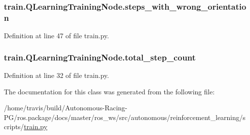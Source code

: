 \subsubsection[{\texorpdfstring{steps\+\_\+with\+\_\+wrong\+\_\+orientation}{steps_with_wrong_orientation}}]{\setlength{\rightskip}{0pt plus 5cm}train.\+Q\+Learning\+Training\+Node.\+steps\+\_\+with\+\_\+wrong\+\_\+orientation}\hypertarget{classtrain_1_1_q_learning_training_node_a87a28e543665823ac18758f6a4460d7a}{}\label{classtrain_1_1_q_learning_training_node_a87a28e543665823ac18758f6a4460d7a}


Definition at line 47 of file train.\+py.

\subsubsection[{\texorpdfstring{total\+\_\+step\+\_\+count}{total_step_count}}]{\setlength{\rightskip}{0pt plus 5cm}train.\+Q\+Learning\+Training\+Node.\+total\+\_\+step\+\_\+count}\hypertarget{classtrain_1_1_q_learning_training_node_aa583fe782e5ae47cc64dd44b92fd2e71}{}\label{classtrain_1_1_q_learning_training_node_aa583fe782e5ae47cc64dd44b92fd2e71}


Definition at line 32 of file train.\+py.



The documentation for this class was generated from the following file\+:\begin{DoxyCompactItemize}
\item 
/home/travis/build/\+Autonomous-\/\+Racing-\/\+P\+G/ros.\+package/docs/master/ros\+\_\+ws/src/autonomous/reinforcement\+\_\+learning/scripts/\hyperlink{reinforcement__learning_2scripts_2train_8py}{train.\+py}\end{DoxyCompactItemize}
